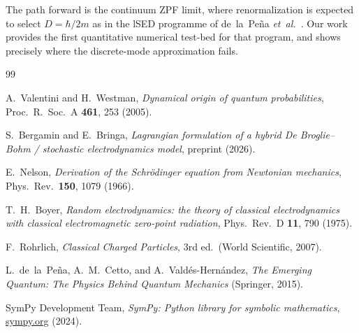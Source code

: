 \documentclass[aps,prl,twocolumn,superscriptaddress]{revtex4-2}
\begin{document}
The path forward is the continuum ZPF limit, where renormalization is
expected to select $D = \hbar/2m$ as in the lSED programme of
de~la~Pe\~na \textit{et~al.}~\cite{delaPena2015}.
Our work provides the first quantitative numerical test-bed for that
program, and shows precisely where the discrete-mode approximation fails.

\begin{acknowledgments}
[TBD]
\end{acknowledgments}

\begin{thebibliography}{99}

  A.~Valentini and H.~Westman,
  \textit{Dynamical origin of quantum probabilities},
  Proc.\ R.\ Soc.\ A \textbf{461}, 253 (2005).

  S.~Bergamin and E.~Bringa,
  \textit{Lagrangian formulation of a hybrid De Broglie--Bohm / stochastic
  electrodynamics model},
  preprint (2026).

  E.~Nelson,
  \textit{Derivation of the Schrödinger equation from Newtonian mechanics},
  Phys.\ Rev.\ \textbf{150}, 1079 (1966).

  T.~H.~Boyer,
  \textit{Random electrodynamics: the theory of classical electrodynamics
  with classical electromagnetic zero-point radiation},
  Phys.\ Rev.\ D \textbf{11}, 790 (1975).

  F.~Rohrlich,
  \textit{Classical Charged Particles}, 3rd ed.\
  (World Scientific, 2007).

  L.~de~la~Pe\~na, A.~M.~Cetto, and A.~Vald\'es-Hern\'andez,
  \textit{The Emerging Quantum: The Physics Behind Quantum Mechanics}
  (Springer, 2015).

  SymPy Development Team,
  \textit{SymPy: Python library for symbolic mathematics},
  \href{https://www.sympy.org}{sympy.org} (2024).

\end{thebibliography}
\end{document}
